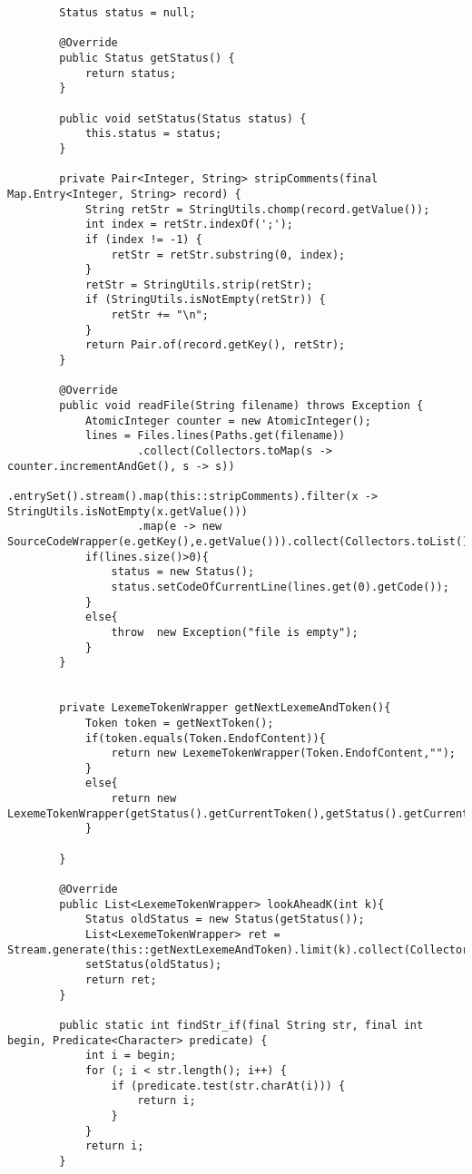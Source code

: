 \documentclass[12pt]{extarticle}
\begin{document}
\begin{enumerate}
\begin{lstlisting}
        Status status = null;
    
        @Override
        public Status getStatus() {
            return status;
        }
    
        public void setStatus(Status status) {
            this.status = status;
        }
    
        private Pair<Integer, String> stripComments(final Map.Entry<Integer, String> record) {
            String retStr = StringUtils.chomp(record.getValue());
            int index = retStr.indexOf(';');
            if (index != -1) {
                retStr = retStr.substring(0, index);
            }
            retStr = StringUtils.strip(retStr);
            if (StringUtils.isNotEmpty(retStr)) {
                retStr += "\n";
            }
            return Pair.of(record.getKey(), retStr);
        }
    
        @Override
        public void readFile(String filename) throws Exception {
            AtomicInteger counter = new AtomicInteger();
            lines = Files.lines(Paths.get(filename))
                    .collect(Collectors.toMap(s -> counter.incrementAndGet(), s -> s))
                    .entrySet().stream().map(this::stripComments).filter(x -> StringUtils.isNotEmpty(x.getValue()))
                    .map(e -> new SourceCodeWrapper(e.getKey(),e.getValue())).collect(Collectors.toList());
            if(lines.size()>0){
                status = new Status();
                status.setCodeOfCurrentLine(lines.get(0).getCode());
            }
            else{
                throw  new Exception("file is empty");
            }
        }
    
    
        private LexemeTokenWrapper getNextLexemeAndToken(){
            Token token = getNextToken();
            if(token.equals(Token.EndofContent)){
                return new LexemeTokenWrapper(Token.EndofContent,"");
            }
            else{
                return new LexemeTokenWrapper(getStatus().getCurrentToken(),getStatus().getCurrentLexeme());
            }
    
        }
    
        @Override
        public List<LexemeTokenWrapper> lookAheadK(int k){
            Status oldStatus = new Status(getStatus());
            List<LexemeTokenWrapper> ret = Stream.generate(this::getNextLexemeAndToken).limit(k).collect(Collectors.toList());
            setStatus(oldStatus);
            return ret;
        }
    
        public static int findStr_if(final String str, final int begin, Predicate<Character> predicate) {
            int i = begin;
            for (; i < str.length(); i++) {
                if (predicate.test(str.charAt(i))) {
                    return i;
                }
            }
            return i;
        }
    

\end{lstlisting}
\end{enumerate}
\end{document}
